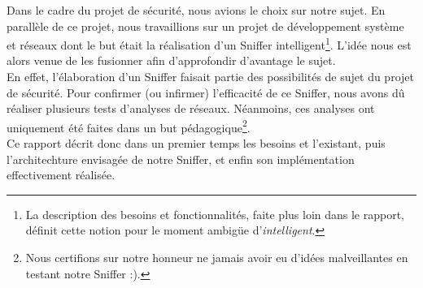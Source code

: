 Dans le cadre du projet de sécurité, nous avions le choix sur notre sujet. En parallèle de ce projet, nous travaillions sur un projet de développement système et réseaux dont le but était la réalisation d'un Sniffer intelligent\footnote{La description des besoins et fonctionnalités, faite  plus loin dans le rapport, définit cette notion pour le moment ambigüe d'\emph{intelligent}.}. L'idée nous est alors venue de les fusionner afin d'approfondir d'avantage le sujet.\\

En effet, l'élaboration d'un Sniffer faisait partie des possibilités de sujet du projet de sécurité. Pour confirmer (ou infirmer) l'efficacité de ce Sniffer, nous avons dû réaliser plusieurs tests d'analyses de réseaux. Néanmoins, ces analyses ont uniquement été faites dans un but pédagogique\footnote{Nous certifions sur notre honneur ne jamais avoir eu d'idées malveillantes en testant notre Sniffer :).}.\\

 Ce rapport décrit donc dans un premier temps les besoins et l'existant, puis l'architechture envisagée de notre Sniffer, et enfin son implémentation effectivement réalisée.
